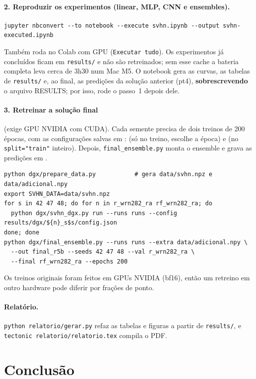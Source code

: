 \documentclass[11pt,a4paper]{article}
\begin{document}
\paragraph{2. Reproduzir os experimentos (linear, MLP, CNN e ensembles).}
\begin{verbatim}
jupyter nbconvert --to notebook --execute svhn.ipynb --output svhn-executed.ipynb
\end{verbatim}
Também roda no Colab com GPU (\texttt{Executar tudo}). Os experimentos já concluídos ficam em \texttt{results/} e
não são retreinados; sem esse cache a bateria completa leva cerca de 3h30 num Mac M5. O notebook gera as curvas,
as tabelas de \texttt{results/} e, ao final, as predições da solução anterior (pt4), \textbf{sobrescrevendo} o arquivo RESULTS; por isso, rode o passo~1 depois dele.

\paragraph{3. Retreinar a solução final} (exige GPU NVIDIA com CUDA). Cada semente precisa de dois treinos de 200
épocas, com as configurações salvas em :  (só no
treino, escolhe a época) e  (no \texttt{split="train"} inteiro). Depois,
\texttt{final\_ensemble.py} monta o ensemble e grava as predições em .
\begin{verbatim}
python dgx/prepare_data.py           # gera data/svhn.npz e data/adicional.npy
export SVHN_DATA=data/svhn.npz
for s in 42 47 48; do for n in r_wrn282_ra rf_wrn282_ra; do
  python dgx/svhn_dgx.py run --runs runs --config results/dgx/${n}_s$s/config.json
done; done
python dgx/final_ensemble.py --runs runs --extra data/adicional.npy \
  --out final_r5b --seeds 42 47 48 --val r_wrn282_ra \
  --final rf_wrn282_ra --epochs 200
\end{verbatim}
Os treinos originais foram feitos em GPUs NVIDIA (bf16), então um retreino em outro hardware pode diferir por frações
de ponto.

\paragraph{Relatório.} \texttt{python relatorio/gerar.py} refaz as tabelas e figuras a partir de
\texttt{results/}, e \texttt{tectonic relatorio/relatorio.tex} compila o PDF.

\clearpage
\section{Conclusão}
\end{document}
